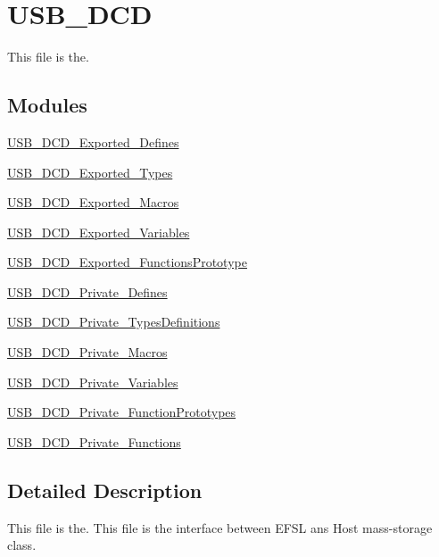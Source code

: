\hypertarget{group___u_s_b___d_c_d}{\section{U\-S\-B\-\_\-\-D\-C\-D}
\label{group___u_s_b___d_c_d}
}


This file is the.  


\subsection*{Modules}
\begin{DoxyCompactItemize}
\item 
\hyperlink{group___u_s_b___d_c_d___exported___defines}{U\-S\-B\-\_\-\-D\-C\-D\-\_\-\-Exported\-\_\-\-Defines}
\item 
\hyperlink{group___u_s_b___d_c_d___exported___types}{U\-S\-B\-\_\-\-D\-C\-D\-\_\-\-Exported\-\_\-\-Types}
\item 
\hyperlink{group___u_s_b___d_c_d___exported___macros}{U\-S\-B\-\_\-\-D\-C\-D\-\_\-\-Exported\-\_\-\-Macros}
\item 
\hyperlink{group___u_s_b___d_c_d___exported___variables}{U\-S\-B\-\_\-\-D\-C\-D\-\_\-\-Exported\-\_\-\-Variables}
\item 
\hyperlink{group___u_s_b___d_c_d___exported___functions_prototype}{U\-S\-B\-\_\-\-D\-C\-D\-\_\-\-Exported\-\_\-\-Functions\-Prototype}
\item 
\hyperlink{group___u_s_b___d_c_d___private___defines}{U\-S\-B\-\_\-\-D\-C\-D\-\_\-\-Private\-\_\-\-Defines}
\item 
\hyperlink{group___u_s_b___d_c_d___private___types_definitions}{U\-S\-B\-\_\-\-D\-C\-D\-\_\-\-Private\-\_\-\-Types\-Definitions}
\item 
\hyperlink{group___u_s_b___d_c_d___private___macros}{U\-S\-B\-\_\-\-D\-C\-D\-\_\-\-Private\-\_\-\-Macros}
\item 
\hyperlink{group___u_s_b___d_c_d___private___variables}{U\-S\-B\-\_\-\-D\-C\-D\-\_\-\-Private\-\_\-\-Variables}
\item 
\hyperlink{group___u_s_b___d_c_d___private___function_prototypes}{U\-S\-B\-\_\-\-D\-C\-D\-\_\-\-Private\-\_\-\-Function\-Prototypes}
\item 
\hyperlink{group___u_s_b___d_c_d___private___functions}{U\-S\-B\-\_\-\-D\-C\-D\-\_\-\-Private\-\_\-\-Functions}
\end{DoxyCompactItemize}


\subsection{Detailed Description}
This file is the. This file is the interface between E\-F\-S\-L ans Host mass-\/storage class.